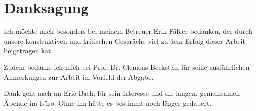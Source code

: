 \section*{Danksagung}
Ich möchte mich besonders bei meinem Betreuer Erik Fäßler bedanken, der durch unsere konstruktiven und kritischen Gespräche viel zu dem Erfolg dieser Arbeit beigetragen hat. \par

Zudem bedanke ich mich bei Prof. Dr. Clemens Beckstein für seine ausführlichen Anmerkungen zur Arbeit im Vorfeld der Abgabe. \par

Dank geht auch an Eric Bach, für sein Interesse und die langen, gemeinsamen Abende im Büro. Ohne ihn hätte es bestimmt noch länger gedauert.